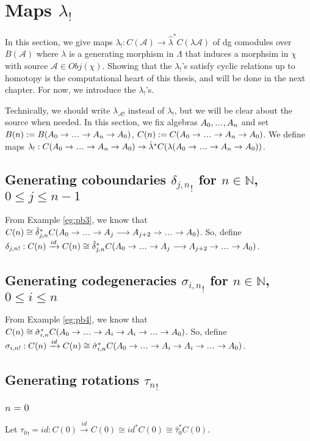 \section{Maps $\lambda_!$}
\label{sec:shriek_maps}
In this section, 
we give maps $\lambda_!: 
C(\mathcal{A}) \to 
\hat{\lambda}^*C(\lambda \mathcal{A})$ 
of dg comodules 
over $B(\mathcal{A})$ where 
$\lambda$ is a generating morphism 
in $\Lambda$ 
that induces a morphsim in $\chi$ 
with source $\mathcal{A} \in Obj(\chi)$. 
Showing that the 
$\lambda_!$'s satisfy cyclic relations 
up to homotopy is the 
computational heart of this thesis, 
and will be done in the next chapter. 
For now, we introduce the $\lambda_!$'s.

Technically, we should write 
$\lambda_{\mathcal{A}!}$ instead of 
$\lambda_!$, but we will be clear 
about the source when needed. 
In this section, we 
fix algebras $A_0, \smdots, A_n$ and set 
$B(n) := B(A_0 \to \smdots \to A_n \to A_0)$, 
$C(n) := C(A_0 \to \smdots \to A_n \to A_0)$. 
We define maps $\lambda_!: 
C(A_0 \to \smdots \to A_n \to A_0) \to 
\hat{\lambda}^*C(\lambda(A_0 \to 
\smdots \to A_n \to A_0))$.
%
\subsection{Generating coboundaries 
  ${\delta_{j,n}}_!$ for $n \in \mathbb{N}$, 
  $0 \leq j \leq n-1$}
From Example \ref{eg:pb3}, we know that $C(n) \cong 
\hat{\delta}_{j,n}^*C(A_0 \to \smdots \to A_j 
\longrightarrow A_{j+2} \to \smdots \to A_0)$. 
So, define
$\delta_{j,n!}:C(n)
\xrightarrow{id} C(n) \cong 
\hat{\delta}_{j,n}^*C(A_0 \to \smdots \to A_j 
\longrightarrow A_{j+2} \to \smdots \to A_0)$.
%
\subsection{Generating codegeneracies 
  ${\sigma_{i,n}}_!$ for $n \in \mathbb{N}$, 
  $0 \leq i \leq n$}
From Example \ref{eg:pb4}, we know that $C(n) 
\cong \hat{\sigma}_{i,n}^*C(A_0 \to \smdots \to A_i 
\to A_i \to \smdots \to A_0)$. 
So, define
$\sigma_{i,n!}:C(n)
\xrightarrow{id} C(n) \cong 
\hat{\sigma}_{i,n}^*C(A_0 \to \smdots \to A_i 
\to A_i \to \smdots \to A_0)$.
%
\subsection{Generating rotations ${\tau_n}_!$}
\subsubsection{$n=0$}
Let ${\tau_0}_! = id: C(0) 
\xrightarrow{id} C(0) \cong 
id^*C(0) \cong \hat{\tau}_0^*C(0)$.
%
